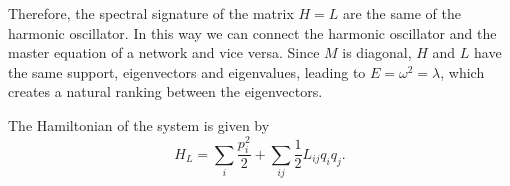 Therefore, the spectral signature of the matrix $H = L$ are the same of the harmonic oscillator. In this way we can connect the harmonic oscillator and the master equation of a network and vice versa. Since $M$ is diagonal, $H$ and $L$ have the same support, eigenvectors and eigenvalues, leading to $E = \omega^2 = \lambda$, which creates a natural ranking between the eigenvectors. 

The Hamiltonian of the system is given by
\begin{equation}\label{H_L}
    H_L = \sum_i \frac{p_i^2}{2} + \sum_{ij} \frac{1}{2}L_{ij}q_iq_j.
\end{equation}



